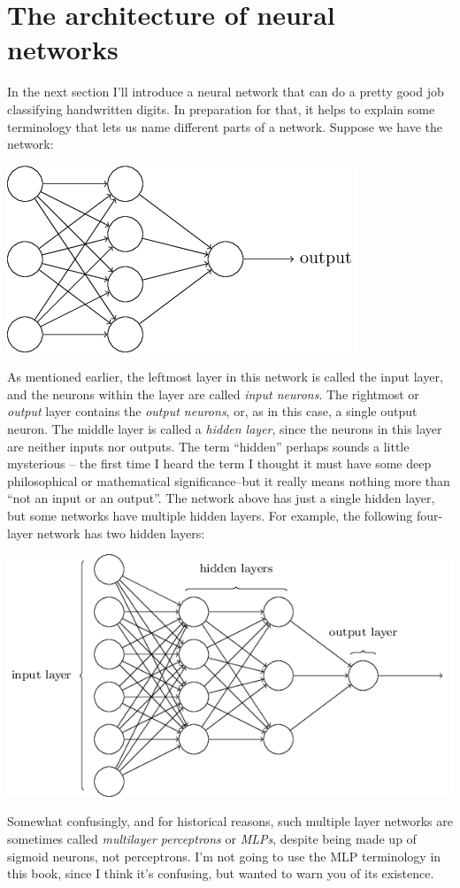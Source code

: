 \documentclass[a4paper,twoside,10pt]{book}
\begin{document}
\section{The architecture of neural networks}
In the next section I'll introduce a neural network that can do a pretty good job classifying handwritten digits. In preparation for that, it helps to explain some terminology that lets us name different parts of a network. Suppose we have the network:

\begin{center}
	\includegraphics[scale=0.5]{./figures/ch1/tikz10}
\end{center}
As mentioned earlier, the leftmost layer in this network is called the input layer, and the neurons within the layer are called \textit{input neurons}. The rightmost or \textit{output} layer contains the \textit{output neurons}, or, as in this case, a single output neuron. The middle layer is called a \textit{hidden layer}, since the neurons in this layer are neither inputs nor outputs. The term ``hidden'' perhaps sounds a little mysterious -- the first time I heard the term I thought it must have some deep philosophical or mathematical significance--but it really means nothing more than ``not an input or an output''. The network above has just a single hidden layer, but some networks have multiple hidden layers. For example, the following four-layer network has two hidden layers:

\begin{center}
	\includegraphics[scale=0.5]{./figures/ch1/tikz11}
\end{center}
Somewhat confusingly, and for historical reasons, such multiple layer networks are sometimes called \textit{multilayer perceptrons} or \textit{MLPs}, despite being made up of sigmoid neurons, not perceptrons. I'm not going to use the MLP terminology in this book, since I think it's confusing, but wanted to warn you of its existence.
\end{document}

